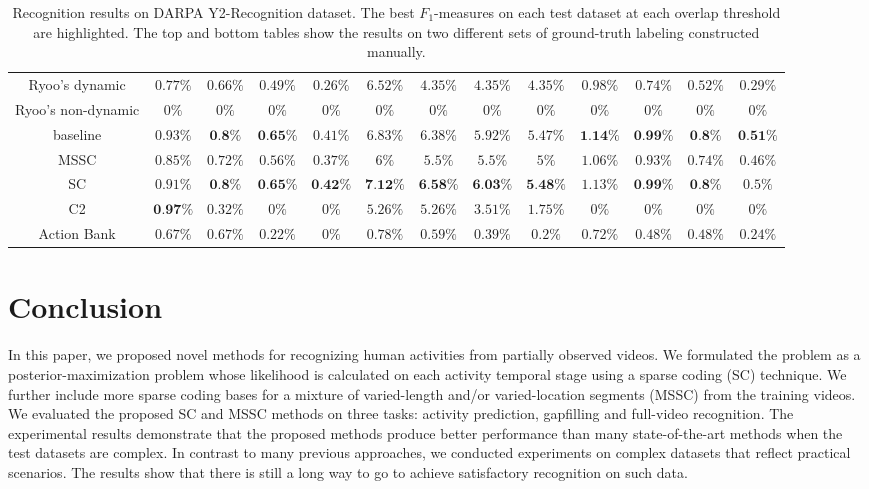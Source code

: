 \begin{table}[htbp]
\begin{center}
{\begin{tabular}{c||c|c|c|c|c|c|c|c|c|c|c|c}
        \hline
        Ryoo's dynamic & $0.77\%$ & $0.66\%$ & $0.49\%$ & $0.26\%$ & $6.52\%$ & $4.35\%$ & $4.35\%$ & $4.35\%$ & $0.98\%$ & $0.74\%$ & $0.52\%$ & $0.29\%$\\
        Ryoo's non-dynamic & $0\%$ & $0\%$ & $0\%$ & $0\%$ & $0\%$ & $0\%$ & $0\%$ & $0\%$ & $0\%$ & $0\%$ & $0\%$ & $0\%$\\
        baseline & $0.93\%$ & $\textbf{0.8\%}$ & $\textbf{0.65}\%$ & $0.41\%$ & $6.83\%$ & $6.38\%$ & $5.92\%$ & $5.47\%$ & $\textbf{1.14\%}$ & $\textbf{0.99\%}$ & $\textbf{0.8\%}$ & $\textbf{0.51\%}$\\
        MSSC & $0.85\%$ & $0.72\%$ & $0.56\%$ & $0.37\%$ & $6\%$ & $5.5\%$ & $5.5\%$ & $5\%$ & $1.06\%$ & $0.93\%$ & $0.74\%$ & $0.46\%$\\
        SC & $0.91\%$ & $\textbf{0.8}\%$ & $\textbf{0.65\%}$ & $\textbf{0.42\%}$ & $\textbf{7.12\%}$ & $\textbf{6.58}\%$ & $\textbf{6.03}\%$ & $\textbf{5.48}\%$ & $1.13\%$ & $\textbf{0.99\%}$ & $\textbf{0.8\%}$ & $0.5\%$\\
        C2 & $\textbf{0.97\%}$ & $0.32\%$ & $0\%$ & $0\%$ & $5.26\%$ & $5.26\%$ & $3.51\%$ & $1.75\%$ & $0\%$ & $0\%$ & $0\%$ & $0\%$\\
        Action Bank & $0.67\%$ & $0.67\%$ & $0.22\%$ & $0\%$ & $0.78\%$ & $0.59\%$ & $0.39\%$ & $0.2\%$ & $0.72\%$ & $0.48\%$ & $0.48\%$ & $0.24\%$\\
        \hline\hline
      \end{tabular}}
  \end{center}
  \caption{Recognition results on DARPA Y2-Recognition dataset. The best $F_1$-measures on each test dataset at each
    overlap threshold are highlighted. The top and bottom tables show the results
    on two different sets of ground-truth labeling constructed manually.}
  \label{tab:recognition_comparison}
\end{table}

\vspace{-3mm}
\section{Conclusion}\label{sec:conclusion}
In this paper, we proposed novel methods for recognizing human activities from
partially observed videos. We formulated the problem as a
posterior-maximization problem whose likelihood is calculated on each activity
temporal {\color{black}stage} using a sparse coding (SC) technique. We further
include more sparse coding bases for a mixture of varied-length and/or
varied-location segments (MSSC) from the training videos. We evaluated the
proposed SC and MSSC methods on three tasks: activity prediction, gapfilling
and full-video recognition.  The experimental results demonstrate that the
proposed methods produce better {\color{black}performance} than many
state-of-the-art methods when the test datasets are complex. In contrast to
many previous approaches, we conducted experiments on complex datasets that
reflect practical scenarios. The results show that there is still a long way to
go to achieve satisfactory recognition on such data.
